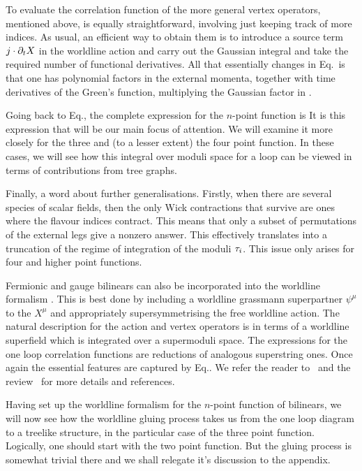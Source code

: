To evaluate the correlation function of the more general vertex operators, mentioned above,
is equally straightforward, involving just keeping track of more indices. As usual, 
an efficient 
way to obtain them is to introduce a source term $j\cdot\partial_tX$ in the worldline action and 
carry out the Gaussian integral and take the required number of functional derivatives.
All that essentially changes in Eq.\modint\ is that one has polynomial
factors in the external momenta, together with time derivatives of the Green's function,
multiplying the Gaussian factor in \modint .

Going back to Eq.\wlnpt , the complete expression for the $n$-point function is  
\eqn{}
It is this expression that will be our main focus of attention. We will examine it more 
closely for the three and (to a lesser extent) the four point function. 
In these cases, we will see how
this integral over moduli space for a loop can
be viewed in terms of contributions from tree graphs.  

Finally, a word about further generalisations. Firstly, when there are several species
of scalar fields, then the only Wick contractions that survive are ones where the flavour
indices contract. This means that only a subset of permutations of the external legs give
a nonzero answer. This effectively translates into a truncation of the regime of 
integration of the moduli ${\tau}_i$. This issue only arises for four and higher point 
functions.

Fermionic and gauge bilinears can also be incorporated into the worldline formalism \bdh .
This is best done 
by including a worldline grassmann superpartner $\psi^{\mu}$
to the $X^{\mu}$ and appropriately
supersymmetrising the free worldline action. The natural description for the action 
and vertex operators is in terms of a worldline superfield which is integrated over a 
supermoduli space. The expressions for the one loop correlation functions
are reductions of analogous superstring ones. Once again the essential features are captured by 
Eq.\wlint .
We refer the reader to \strass\ and the review \schb\
for more details and references. 


Having set up the worldline formalism for the $n$-point function of bilinears, we will 
now see how the worldline
gluing process takes us from the one loop diagram to a treelike structure,
in the particular 
case of the three point function. Logically, one should start with  
the two point function. But 
the gluing process is somewhat trivial there and we shall relegate it's discussion
to the appendix. 

